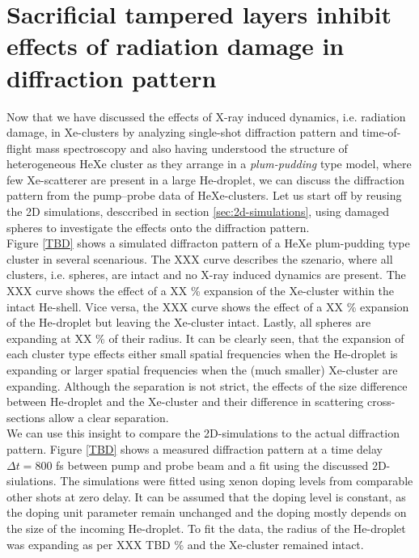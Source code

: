 \section{Sacrificial tampered layers inhibit effects of radiation damage in diffraction pattern}\label{sec:helium-xenon-data}
Now that we have discussed the effects of X-ray induced dynamics, i.e. radiation damage, in Xe-clusters by analyzing single-shot diffraction pattern and time-of-flight mass spectroscopy and also having understood the structure of heterogeneous HeXe cluster as they arrange in a \textit{plum-pudding} type model, where few Xe-scatterer are present in a large He-droplet, we can discuss the diffraction pattern from the pump--probe data of HeXe-clusters. Let us start off by reusing the 2D simulations, desccribed in section \ref{sec:2d-simulations}, using damaged spheres to investigate the effects onto the diffraction pattern.\\
Figure \ref{TBD} shows a simulated diffracton pattern of a HeXe plum-pudding type cluster in several scenarious. The XXX curve describes the szenario, where all clusters, i.e. spheres, are intact and no X-ray induced dynamics are present. The XXX curve shows the effect of a XX \% expansion of the Xe-cluster within the intact He-shell. Vice versa, the XXX curve shows the effect of a XX \% expansion of the He-droplet but leaving the Xe-cluster intact. Lastly, all spheres are expanding at XX \% of their radius. It can be clearly seen, that the expansion of each cluster type effects either small spatial frequencies when the He-droplet is expanding or larger spatial frequencies when the (much smaller) Xe-cluster are expanding. Although the separation is not strict, the effects of the size difference between He-droplet and the Xe-cluster and their difference in scattering cross-sections allow a clear separation.\\
We can use this insight to compare the 2D-simulations to the actual diffraction pattern. Figure \ref{TBD} shows a measured diffraction pattern at a time delay $\Delta t=800$ fs between pump and probe beam and a fit using the discussed 2D-siulations. The simulations were fitted using xenon doping levels from comparable other shots at zero delay. It can be assumed that the doping level is constant, as the doping unit parameter remain unchanged and the doping mostly depends on the size of the incoming He-droplet. To fit the data, the radius of the He-droplet was expanding as per XXX TBD \% and the Xe-cluster remained intact.\\
